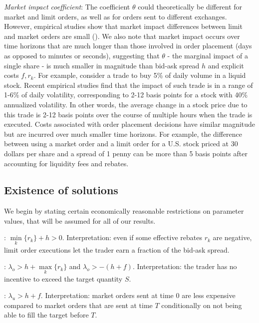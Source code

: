 \documentclass[opre,nonblindrev]{informs3}
\begin{document}
{\it Market impact coefficient}:  The coefficient $\theta$ could theoretically be different for market and limit orders, as well as for orders sent to different exchanges. However, empirical studies show that market impact differences between limit and market orders are small (\cite{eisler10,Mastromatteo2013}). We also note that market impact occurs over time horizons that are much longer than those involved in order placement (days as opposed to minutes or seconds), suggesting that $\theta$ - the marginal impact of a single share - is much smaller in magnitude than bid-ask spread $h$ and explicit costs $f,r_k$. For example, consider a trade to buy 5\% of daily volume in a liquid stock. Recent empirical studies \citep{almgren05, Mastromatteo2013} find that the impact of such trade is in a range of 1-6\% of daily volatility, corresponding to 2-12 basis points for a stock with 40\% annualized volatility. In other words, the average change in a stock price due to this trade is 2-12 basis points over the course of multiple hours when the trade is executed. Costs associated with order placement decisions have similar magnitude but are incurred over much smaller time horizons. For example, the difference between using a market order and a limit order for a U.S. stock priced at 30 dollars per share and a spread of 1 penny can be more than 5 basis points after accounting for liquidity fees and rebates.

\subsection{Existence of solutions}

We begin by stating certain economically reasonable restrictions on parameter values, that will be assumed for all of our results.

: $\underset{k}{\min}\{r_k\}+h > 0$. Interpretation: even if some effective rebates $r_k$ are negative, limit order executions let the trader earn a fraction of the bid-ask spread.

: $\lambda_o > h+\underset{k}{\max}\{r_k\}$ and $\lambda_o > -(h+f)$. Interpretation: the trader has no incentive to exceed the target quantity $S$.

: $\lambda_u > h+f$. Interpretation: market orders sent at time 0 are less expensive compared to market orders that are sent at time $T$ conditionally on not being able to fill the target before $T$.

\end{document}
